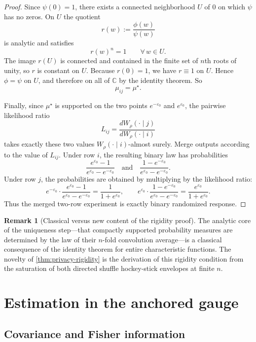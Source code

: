 \documentclass[11pt]{amsart}
\theoremstyle{definition}
\newtheorem{remark}[remark]{Remark}
\begin{document}
\begin{proof}
Since $\psi(0)=1$, there exists a connected neighborhood $U$ of $0$ on which $\psi$ has no zeros. On $U$ the quotient
\[
r(w):=\frac{\phi(w)}{\psi(w)}
\]
is analytic and satisfies
\[
r(w)^n=1\qquad \forall\,w\in U.
\]
The image $r(U)$ is connected and contained in the finite set of $n$th roots of unity, so $r$ is constant on $U$. Because $r(0)=1$, we have $r\equiv 1$ on $U$. Hence $\phi=\psi$ on $U$, and therefore on all of $\mathbb C$ by the identity theorem. So
\[
\mu_{ij}=\mu^\star.
\]

Finally, since $\mu^\star$ is supported on the two points $e^{-\varepsilon_0}$ and $e^{\varepsilon_0}$, the pairwise likelihood ratio
\[
L_{ij}=\frac{dW_\rho(\cdot\mid j)}{dW_\rho(\cdot\mid i)}
\]
takes exactly these two values $W_\rho(\cdot\mid i)$-almost surely. Merge outputs according to the value of $L_{ij}$. Under row $i$, the resulting binary law has probabilities
\[
\frac{e^{\varepsilon_0}-1}{e^{\varepsilon_0}-e^{-\varepsilon_0}}
\quad\text{and}\quad
\frac{1-e^{-\varepsilon_0}}{e^{\varepsilon_0}-e^{-\varepsilon_0}}.
\]
Under row $j$, the probabilities are obtained by multiplying by the likelihood ratio:
\[
e^{-\varepsilon_0}\cdot \frac{e^{\varepsilon_0}-1}{e^{\varepsilon_0}-e^{-\varepsilon_0}}
=
\frac{1}{1+e^{\varepsilon_0}},
\qquad
e^{\varepsilon_0}\cdot \frac{1-e^{-\varepsilon_0}}{e^{\varepsilon_0}-e^{-\varepsilon_0}}
=
\frac{e^{\varepsilon_0}}{1+e^{\varepsilon_0}}.
\]
Thus the merged two-row experiment is exactly binary randomized response.
\end{proof}

\begin{remark}[Classical versus new content of the rigidity proof]
The analytic core of the uniqueness step---that compactly supported probability measures are determined by the law of their $n$-fold convolution average---is a classical consequence of the identity theorem for entire characteristic functions. The novelty of \cref{thm:privacy-rigidity} is the derivation of this rigidity condition from the saturation of both directed shuffle hockey-stick envelopes at finite $n$.
\end{remark}

\section{Estimation in the anchored gauge}\label{sec:design}

\subsection{Covariance and Fisher information}
\end{document}
